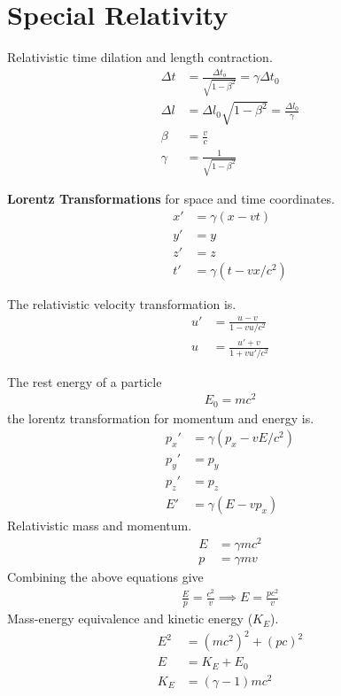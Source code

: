 \chapter{Special Relativity}
\thispagestyle{fancy}
\begin{multicols}{2}
Relativistic time dilation and length contraction.
\begin{align}
\Delta t &= \frac{\Delta t_o}{\sqrt{1-\beta^2}} = \gamma \Delta t_0 \\
\Delta l &= \Delta l_0 \sqrt{1 - \beta^2} = \frac{\Delta l_0}{\gamma} \\
\beta &= \frac{v}{c} \\
\gamma &= \frac{1}{\sqrt{1-\beta^2}}
\end{align}

\textbf{Lorentz Transformations} for space and time coordinates.
\begin{align}
x'&= \gamma(x-vt) \\
y'&=y \\
z' &= z \\
t'&= \gamma (t-vx/c^2)
\end{align}

The relativistic velocity transformation is.
\begin{align}
u' &= \frac{u-v}{1-vu/c^2} \\
u &= \frac{u'+v}{1+vu'/c^2}
\end{align}

The rest energy of a particle
\begin{align}
E_0=mc^2
\end{align}
the lorentz transformation for momentum and energy is.
\begin{align}
p_x' &= \gamma(p_x-vE/c^2) \\
p_y' &= p_y \\
p_z' &= p_z \\
E' &= \gamma(E-vp_x)
\end{align}
Relativistic mass and momentum.
\begin{align}
E &=\gamma mc^2 \\
p &= \gamma mv
\end{align}
Combining the above equations give 
\begin{align}
\frac{E}{p} = \frac{c^2}{v} \implies E=\frac{pc^2}{v}
\end{align}
Mass-energy equivalence and kinetic energy ($K_E$).
\begin{align}
E^2 &=(mc^2)^2 + (pc)^2 \\
E &= K_E + E_0 \\
K_E &= (\gamma - 1)mc^2 
\end{align}


\end{multicols}
